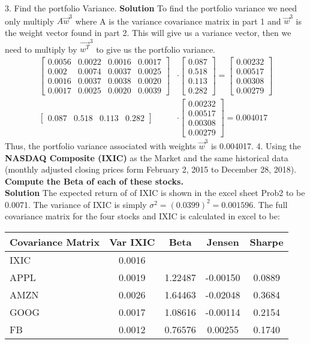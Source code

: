 \documentclass[12pt]{article}
\newenvironment{problem}[3][Problem]{\begin{trivlist}
\item[\hskip \labelsep {\bfseries #1}\hskip \labelsep {\bfseries #2.}]}{\end{trivlist}}
\begin{document}
\begin{problem}{2 (50 Points)}
\newpage
3. Find the portfolio Variance.
\textbf{Solution} To find the portfolio variance we need only multiply $A\vec{w}^3 $ where A is the variance covariance matrix in part 1 and $\vec{w}^3 $ is the weight vector found in part 2. This will give us a variance vector, then we need to multiply by $\vec{w^T}^3 $ to give us the portfolio variance. 
\begin{align*}
\begin{bmatrix}
0.0056	&0.0022	&0.0016	&0.0017 \\
0.002	&0.0074	&0.0037	&0.0025 \\
0.0016	&0.0037	&0.0038	&0.0020 \\
0.0017	&0.0025	&0.0020	&0.0039 
\end{bmatrix}
&\cdot
\begin{bmatrix}
0.087 \\  0.518 \\ 0.113 \\ 0.282 
\end{bmatrix}
=
\begin{bmatrix}
0.00232 \\
0.00517 \\
 0.00308 \\
 0.00279 
\end{bmatrix} \\
\begin{bmatrix}
0.087 &  0.518 & 0.113 & 0.282 
\end{bmatrix}
&\cdot
\begin{bmatrix}
0.00232 \\
0.00517 \\
 0.00308 \\
 0.00279 
\end{bmatrix}
= 0.004017
\end{align*}
Thus, the portfolio variance associated with weights $\vec{w}^3$ is 0.004017. 
\newpage
4. Using the \textbf{NASDAQ Composite (IXIC)} as the Market and the same historical data
(monthly adjusted closing prices form February 2, 2015 to December 28, 2018).
\textbf{Compute the Beta of each of these stocks.}\\
\textbf{Solution} The expected return of of IXIC is shown in the excel sheet Prob2 to be 0.0071. The variance of IXIC is simply $\sigma^2 = (0.0399)^2 = 0.001596$. The full covariance matrix for the four stocks and IXIC is calculated in excel to be:\\
\begin{tabular}{l|cccc}
Covariance Matrix &	Var IXIC	&Beta	&Jensen	&Sharpe \\
\hline
IXIC	&0.0016	& & & \\		
APPL	&0.0019	&1.22487&	-0.00150	&0.0889 \\
AMZN	&0.0026	&1.64463&	-0.02048	&0.3684 \\
GOOG	&0.0017	&1.08616&	-0.00114	&0.2154\\
FB	&0.0012	&0.76576&	0.00255	&0.1740
\end{tabular}


\end{problem}
\end{document}
